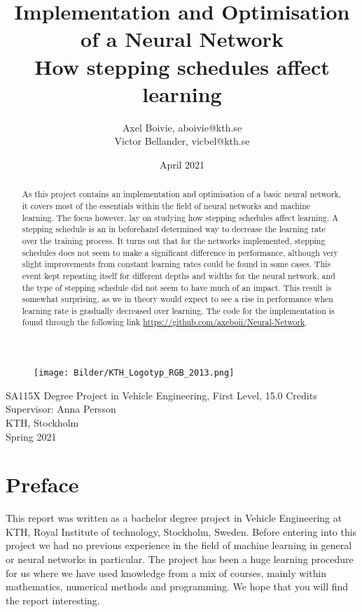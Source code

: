 \documentclass{article}
\title{\huge\textbf{Implementation and Optimisation of a Neural Network}  \\[2ex]
\extaLarge How stepping schedules affect learning}
\author{Axel Boivie, aboivie@kth.se\\Victor Bellander, vicbel@kth.se}
\date{April 2021}
\begin{document}
\begin{figure}[t]
\centering
    \texttt{[image: Bilder/KTH\_Logotyp\_RGB\_2013.png]}
    \label{fig:logo}
\end{figure}

\maketitle
\thispagestyle{empty}

\vfill{\noindent SA115X Degree Project in Vehicle Engineering, First Level, 15.0 Credits\\
Supervisor: Anna Persson\\
KTH, Stockholm\\
Spring 2021}

\newpage

\begin{abstract}
\noindent As this project contains an implementation and optimisation of a basic neural network, it covers most of the essentials within the field of neural networks and machine learning. The focus however, lay on studying how stepping schedules affect learning. A stepping schedule is an in beforehand determined way to decrease the learning rate over the training process. It turns out that for the networks implemented, stepping schedules does not seem to make a significant difference in performance, although very slight improvements from constant learning rates could be found in some cases. This event kept repeating itself for different depths and widths for the neural network, and the type of stepping schedule did not seem to have much of an impact. This result is somewhat surprising, as we in theory would expect to see a rise in performance when learning rate is gradually decreased over learning. The code for the implementation is found through the following link
\url{https://github.com/axeboii/Neural-Network}.
\end{abstract}
\newpage
\section*{Preface}
This report was written as a bachelor degree project in Vehicle Engineering at KTH, Royal Institute of technology, Stockholm, Sweden. Before entering into this project we had no previous experience in the field of machine learning in general or neural networks in particular. The project has been a huge learning procedure for us where we have used knowledge from a mix of courses, mainly within mathematics, numerical methods and programming. We hope that you will find the report interesting. 
\end{document}
